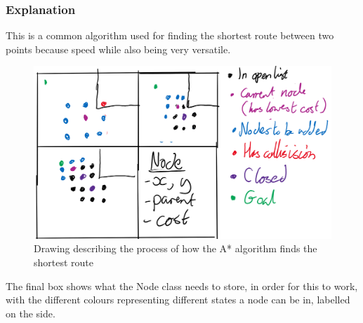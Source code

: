 \documentclass[../Main.tex]{subfiles}
\begin{document}
        \subsubsection{Explanation}
            This is a common algorithm used for finding the shortest route between two points because speed while also being very versatile.
            \begin{figure}[hbt!]
                \centerline{\includegraphics[scale=0.3]{img/Design/A-star algorithm.png}}
                \caption{Drawing describing the process of how the A* algorithm finds the shortest route}
                \label{fig}
            \end{figure}

            The final box shows what the Node class needs to store, in order for this to work, with the different colours representing different states a node can be in, labelled on the side.
\end{document}
